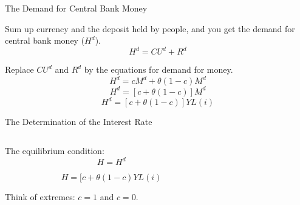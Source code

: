 \documentclass[shownotes,11pt, aspectratio=169]{beamer}
\newenvironment{wideitemize}{\itemize\addtolength{\itemsep}{10pt}}{\enditemize}
\begin{document}
\begin{frame}{The Demand for Central Bank Money}
\begin{wideitemize}
\item Sum up currency and the deposit held by people, and you get the demand for central bank money ($H^d$). \pause
    \[ H^d = CU^d + R^d \]
\item Replace $CU^d$ and $R^d$ by the equations for demand for money. \pause
    \[ H^d = cM^d + \theta (1 - c)M^d \] \pause
    \[ H^d = [c + \theta (1 - c)]M^d \] \pause
    \[ H^d = [c + \theta (1 - c)]YL(i) \] 
\end{wideitemize}
\end{frame}

\begin{frame}{The Determination of the Interest Rate}
\begin{columns}[T] %
\begin{column}{.52\textwidth}
  \begin{wideitemize}
    \item The equilibrium condition: 
         \[ H = H^d \]
    \pause
    \item \[ H = [c + \theta (1 - c)YL(i) \]
    \pause
    \item Think of extremes: $c = 1$ and $c = 0$.
  \end{wideitemize}
\end{column}%
\pause
\hfill%
\begin{column}{.44\textwidth}
\end{column}%
\end{columns}
\end{frame}
\end{document}
